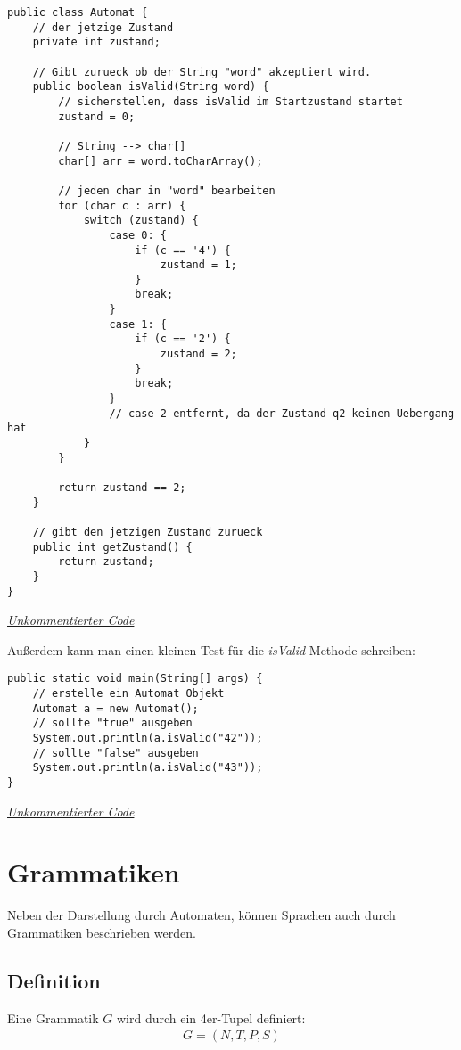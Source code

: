 \begin{center}
\begin{lstlisting}
public class Automat {
    // der jetzige Zustand
    private int zustand;

    // Gibt zurueck ob der String "word" akzeptiert wird.
    public boolean isValid(String word) {
        // sicherstellen, dass isValid im Startzustand startet
        zustand = 0;

        // String --> char[]
        char[] arr = word.toCharArray();

        // jeden char in "word" bearbeiten
        for (char c : arr) {
            switch (zustand) {
                case 0: {
                    if (c == '4') {
                        zustand = 1;
                    }
                    break;
                }
                case 1: {
                    if (c == '2') {
                        zustand = 2;
                    }
                    break;
                }
                // case 2 entfernt, da der Zustand q2 keinen Uebergang hat
            }
        }

        return zustand == 2;
    }

    // gibt den jetzigen Zustand zurueck
    public int getZustand() {
        return zustand;
    }
}
\end{lstlisting}
\href{https://raw.githubusercontent.com/tim-tm/articles/refs/heads/main/informatik-notes/code/Automat.java}{\textit{Unkommentierter Code}} \\
\end{center}

\begin{flushleft}
Außerdem kann man einen kleinen Test für die \textit{isValid} Methode schreiben:
\end{flushleft}

\begin{center}
\begin{lstlisting}
public static void main(String[] args) {
    // erstelle ein Automat Objekt
    Automat a = new Automat();
    // sollte "true" ausgeben
    System.out.println(a.isValid("42"));
    // sollte "false" ausgeben
    System.out.println(a.isValid("43"));
}
\end{lstlisting}
\href{https://raw.githubusercontent.com/tim-tm/articles/refs/heads/main/informatik-notes/code/Automat.java}{\textit{Unkommentierter Code}} \\
\end{center}

\section{Grammatiken}
\begin{flushleft}
Neben der Darstellung durch Automaten, können Sprachen auch durch Grammatiken
beschrieben werden.
\end{flushleft}

\subsection{Definition}
\begin{flushleft}
Eine Grammatik $G$ wird durch ein 4er-Tupel definiert:
\begin{align}
    G=\left(N,T,P,S\right)
\end{align}
\end{flushleft}
